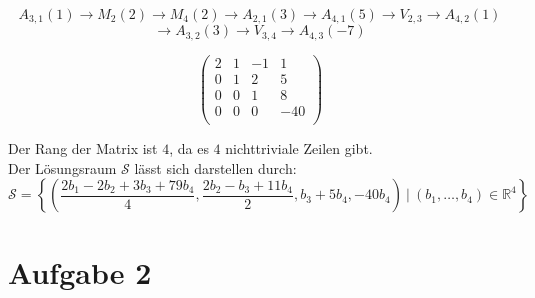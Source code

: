 \documentclass[12pt,a4paper]{article}
\begin{document}
\begin{enumerate}[(a)]
    \[A_{3,1}(1) \rightarrow M_2(2) \rightarrow M_4(2) \rightarrow A_{2,1}(3) \rightarrow A_{4,1}(5) \rightarrow V_{2,3} \rightarrow A_{4,2}(1)\]
    \[\rightarrow A_{3,2}(3) \rightarrow V_{3,4} \rightarrow A_{4,3}(-7)\]

    \begin{equation}
    \label{a1:eq2}
    \begin{pmatrix}
    2 & 1 & -1 & 1\\
    0 & 1 & 2 & 5\\
    0 & 0 & 1 & 8\\
    0 & 0 & 0 & -40\\
    \end{pmatrix}
    \end{equation}

    Der Rang der Matrix ist $4$, da es $4$ nichttriviale Zeilen gibt.\\
    Der Lösungsraum $\mathcal{S}$ lässt sich darstellen durch:
    \[
    \mathcal{S} = \left\{\left(\frac{2b_1 - 2b_2 + 3b_3 + 79b_4}{4}, \frac{2b_2 - b_3 + 11b_4}{2}, b_3 + 5b_4, -40b_4\right)\ \big|\ (b_1, \dots, b_4) \in \mathbb{R}^4\right\}
    \]

\end{enumerate}


\section*{Aufgabe 2}
\end{document}
